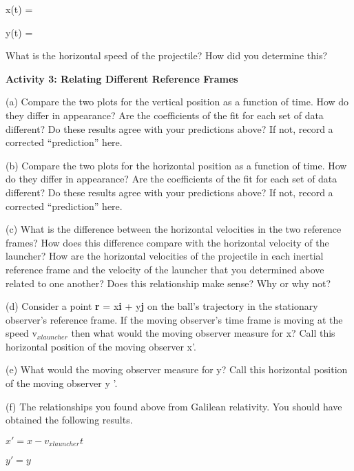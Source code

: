 x(t) =
\vspace{5mm}

y(t) =
\vspace{5mm}

What is the horizontal speed of the projectile? How did you determine
this?
\vspace{60mm}

\textbf{Activity 3: Relating Different Reference Frames}

(a) Compare the two plots for the vertical position as a function
of time. How do they differ in appearance? Are the coefficients of
the fit for each set of data different? Do these results agree with
your predictions above? If not, record a corrected {}``prediction''
here.
\vspace{20mm}

(b) Compare the two plots for the horizontal position as a function
of time. How do they differ in appearance? Are the coefficients of
the fit for each set of data different? Do these results agree with
your predictions above? If not, record a corrected {}``prediction''
here.
\vspace{17mm}

(c) What is the difference between the horizontal velocities in the
two reference frames? How does this difference compare with the horizontal
velocity of the launcher? How are the horizontal velocities of the
projectile in each inertial reference frame and the velocity of the
launcher that you determined above related to one another? Does this
relationship make sense? Why or why not?
\vspace{15mm}

(d) Consider a point \textbf{r} = x\textbf{i} + y\textbf{j} on the
ball's trajectory in the stationary observer's reference frame. If
the moving observer's time frame is moving at the speed v\( _{xlauncher} \)
then what would the moving observer measure for x? Call this horizontal
position of the moving observer x'.
\vspace{15mm}

(e) What would the moving observer measure for y? Call this horizontal
position of the moving observer y '.
\vspace{15mm}

(f) The relationships you found above from Galilean relativity. You
should have obtained the following results.

{\centering \( x'=x-v_{xlauncher}t \)\par}

{\centering \( y'=y \)\par}

